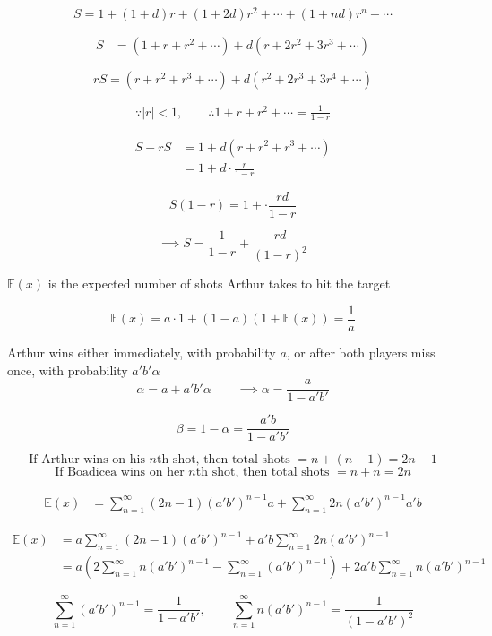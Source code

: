 ﻿\documentclass[12pt]{article}
\newcommand{\E}{\mathbb{E}}
\begin{document}
\[
S=1+(1+d)r+(1+2d)r^2+\cdots +(1+nd)r^n+\cdots
\]

\[
\begin{aligned}
S
&=(1+r+r^2+\cdots)+d(r+2r^2+3r^3+\cdots)
\end{aligned}
\]

\[
rS=(r+r^2+r^3+\cdots)+d(r^2+2r^3+3r^4+\cdots)
\]

\[
\begin{aligned}
\because |r|<1,\qquad \therefore 1+r+r^2+\cdots=\frac{1}{1-r}
\end{aligned}
\]

\[
\begin{aligned}
S-rS
&=1+d(r+r^2+r^3+\cdots)\\
&=1+d\cdot \frac{r}{1-r}
\end{aligned}
\]

\[S(1-r)=1+\cdot \frac{rd}{1-r}
\]

\[
\implies \boxed{S=\frac{1}{1-r}+\frac{rd}{(1-r)^2}}
\]




\bigskip

$\E(x)$ is the expected number of shots Arthur takes to hit the target

\[
\E(x)=a\cdot 1+(1-a)(1+\E(x))=\frac{1}{a}
\]

Arthur wins either immediately, with probability $a$, or after both players miss once, with probability $a'b'\alpha$
\[
\alpha=a+a'b'\alpha\qquad \implies \boxed{\alpha=\frac{a}{1-a'b'}}
\]

\[
\beta=1-\alpha=\frac{a'b}{1-a'b'}
\]

\bigskip



\[
\text{If Arthur wins on his }n\text{th shot, then total shots }=n+(n-1)=2n-1
\]
\[
\text{If Boadicea wins on her }n\text{th shot, then total shots }=n+n=2n
\]

\[
\begin{aligned}
\E(x)&=\sum_{n=1}^{\infty}(2n-1)(a'b')^{n-1}a+\sum_{n=1}^{\infty}2n(a'b')^{n-1}a'b
\end{aligned}
\]

\[
\begin{aligned}
\E(x)&=a\sum_{n=1}^{\infty}(2n-1)(a'b')^{n-1}+a'b\sum_{n=1}^{\infty}2n(a'b')^{n-1}\\
&=a\left(2\sum_{n=1}^{\infty}n(a'b')^{n-1}-\sum_{n=1}^{\infty}(a'b')^{n-1}\right)
+2a'b\sum_{n=1}^{\infty}n(a'b')^{n-1}
\end{aligned}
\]

\[
\sum_{n=1}^{\infty}(a'b')^{n-1}=\frac{1}{1-a'b'},\qquad
\sum_{n=1}^{\infty}n(a'b')^{n-1}=\frac{1}{(1-a'b')^2}
\]
\end{document}
